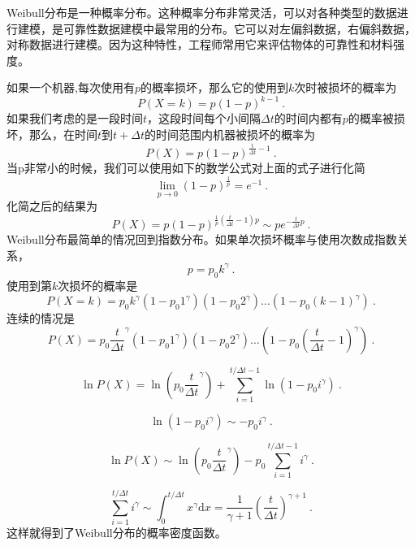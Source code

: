 
Weibull分布是一种概率分布。这种概率分布非常灵活，可以对各种类型的数据进行建模，是可靠性数据建模中最常用的分布。它可以对左偏斜数据，右偏斜数据，对称数据进行建模。因为这种特性，工程师常用它来评估物体的可靠性和材料强度。

如果一个机器,每次使用有$p$的概率损坏，那么它的使用到$k$次时被损坏的概率为
\begin{equation}
P(X=k)=p(1-p)^{k-1}~.
\end{equation}
如果我们考虑的是一段时间$t$，这段时间每个小间隔$\Delta t$的时间内都有$p$的概率被损坏，那么，在时间$t$到$t+\Delta t$的时间范围内机器被损坏的概率为
\begin{equation}
P(X)=p(1-p)^{\frac{t}{\Delta t}-1}~.
\end{equation}
当p非常小的时候，我们可以使用如下的数学公式对上面的式子进行化简
\begin{equation}
\lim _{p \rightarrow 0}(1-p)^{\frac{1}{p}}=e^{-1}~.
\end{equation}
化简之后的结果为
\begin{equation}
P(X)=p(1-p)^{\frac{1}{p}\left(\frac{t}{\Delta t}-1\right) p} \sim p e^{-\frac{t}{\Delta t} p}~.
\end{equation}
Weibull分布最简单的情况回到指数分布。如果单次损坏概率与使用次数成指数关系，
\begin{equation}
p=p_0 k^\gamma~.
\end{equation}
使用到第$k$次损坏的概率是
\begin{equation}
P(X=k)=p_0 k^\gamma\left(1-p_0 1^\gamma\right)\left(1-p_0 2^\gamma\right) \ldots\left(1-p_0(k-1)^\gamma\right)~.
\end{equation}
连续的情况是
\begin{equation}
P(X)=p_0 \frac{t}{\Delta t}^\gamma\left(1-p_0 1^\gamma\right)\left(1-p_0 2^\gamma\right) \ldots\left(1-p_0\left(\frac{t}{\Delta t}-1\right)^\gamma\right)~.
\end{equation}

\begin{equation}
\ln P(X)=\ln \left(p_0 \frac{t}{\Delta t}^\gamma\right)+\sum_{i=1}^{t / \Delta t-1} \ln \left(1-p_0 i^\gamma\right)~.
\end{equation}

\begin{equation}
\ln \left(1-p_0 i^\gamma\right) \sim-p_0 i^\gamma~.
\end{equation}

\begin{equation}
\ln P(X) \sim \ln \left(p_0 \frac{t}{\Delta t}^\gamma\right)-p_0 \sum_{i=1}^{t / \Delta t-1} i^\gamma~.
\end{equation}

\begin{equation}
\sum_{i=1}^{t / \Delta t} i^\gamma \sim \int_0^{t / \Delta t} x^\gamma \mathrm{d} x=\frac{1}{\gamma+1}\left(\frac{t}{\Delta t}\right)^{\gamma+1}~.
\end{equation}
这样就得到了Weibull分布的概率密度函数。